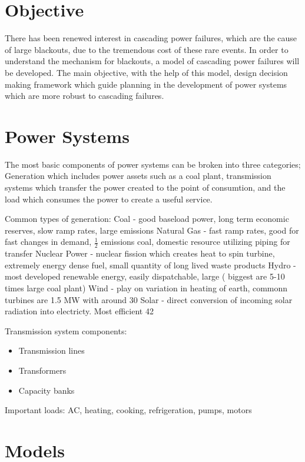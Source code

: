 \section{Objective}

There has been renewed interest in cascading power failures, which are the cause of large blackouts, due to the tremendous cost of these rare events.  In order to understand the mechanism for blackouts, a  model of cascading power failures will be developed.  The main objective, with the help of this model, design decision making framework which guide planning in the development of power systems which are more robust to cascading failures. 
\section{Power Systems}

The most basic components of power systems can be broken into three categories; Generation which includes power assets such as a coal plant, transmission systems which transfer the power created to the point of consumtion, and the load which consumes the power to create a useful service.

Common types of generation:
Coal - good baseload power, long term economic reserves, slow ramp rates, large emissions
Natural Gas - fast ramp rates, good for fast changes in demand, $\frac{1}{2}$ emissions coal, domestic resource utilizing piping for transfer
Nuclear Power - nuclear fission which creates heat to spin turbine, extremely energy dense fuel, small quantity of long lived waste products
Hydro - most developed renewable energy, easily dispatchable, large ( biggest are 5-10 times large coal plant)
Wind - play on variation in heating of earth, commonn turbines are 1.5 MW with around 30 %
Solar - direct conversion of incoming solar radiation into electricty.  Most efficient 42%

Transmission system components:
\begin{itemize}
\item Transmission lines
\item Transformers
\item Capacity banks
\end{itemize}

Important loads:
AC, heating, cooking, refrigeration, pumps, motors

\section{Models}

